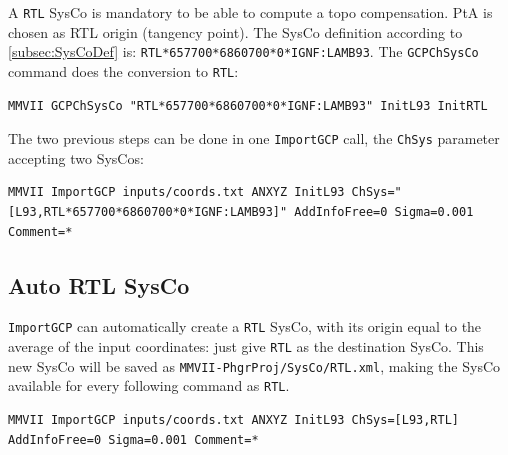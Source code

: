 A \texttt{RTL} SysCo is mandatory to be able to compute a topo compensation.
PtA is chosen as RTL origin (tangency point).
The SysCo definition according to \ref{subsec:SysCoDef} is: \texttt{RTL*657700*6860700*0*IGNF:LAMB93}.
The \texttt{GCPChSysCo} command does the conversion to \texttt{RTL}:

\begin{lstlisting}
MMVII GCPChSysCo "RTL*657700*6860700*0*IGNF:LAMB93" InitL93 InitRTL
\end{lstlisting}


The two previous steps can be done in one \texttt{ImportGCP} call, the \texttt{ChSys} parameter accepting two
SysCos:

\begin{lstlisting}
MMVII ImportGCP inputs/coords.txt ANXYZ InitL93 ChSys="[L93,RTL*657700*6860700*0*IGNF:LAMB93]" AddInfoFree=0 Sigma=0.001 Comment=*
\end{lstlisting}

\subsection{Auto RTL SysCo}

\texttt{ImportGCP} can automatically create a \texttt{RTL} SysCo, with its origin equal to the average of the input coordinates:
just give \texttt{RTL} as the destination SysCo. This new SysCo will be saved as \texttt{MMVII-PhgrProj/SysCo/RTL.xml}, making
the SysCo available for every following command as \texttt{RTL}.

\begin{lstlisting}
MMVII ImportGCP inputs/coords.txt ANXYZ InitL93 ChSys=[L93,RTL] AddInfoFree=0 Sigma=0.001 Comment=*
\end{lstlisting}

